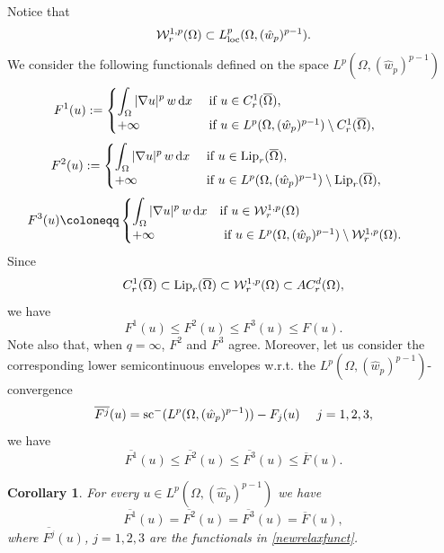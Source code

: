 \documentclass[11pt,leqno]{amsart}
\newtheorem{cor}[teo]{Corollary}
\theoremstyle{remark}
\theoremstyle{definition}
\theoremstyle{definition}
\newcommand{\wstar}{{\hat w}}
\newcommand{\ov}[1]{\overline{#1}}
\def\de{{\rm d}}
\begin{document}
Notice that
\begin{align*}
{\mathcal{W}}^{1,p}_r(\Omega)\subset L^p_{\rm{loc}}(\Omega,(\wstar_{p})^{p-1}).
\end{align*} 
We consider the following functionals defined on the space $L^p(\Omega,(\wstar_{p})^{p-1})$
\begin{equation*}
\!\!\!\!\!\! \!\!\! \!\!\!\!\!\! \!\!\!   F^1(u):=
\begin{cases}
\displaystyle\int_{\Omega} |\nabla u|^p\,w\,\de x &\text{ if } u\in C_{r}^1(\ov{\Omega}),\\
+\infty & \text{ if } u\in L^p(\Omega,(\wstar_{p})^{p-1})\setminus C_{r}^{1}(\ov{\Omega}) ,
\end{cases}
\end{equation*}
\begin{equation*}
\!\!\!\!\!\! \!\!\! \!\!\!\!\!\! \!  F^2(u):=
\begin{cases}
\displaystyle\int_{\Omega}|\nabla u|^p\,w\,\de x &\text{ if } u\in {\rm Lip}_r(\ov{\Omega}),\\
+\infty & \text{ if } u\in L^p(\Omega,(\wstar_{p})^{p-1})\setminus {\rm Lip}_{r}(\ov{\Omega}),
\end{cases}
\end{equation*}
\begin{equation*}
\!\!\!\!\!\! \!\!\! \!\!\!\!\!\! \!\!  F^3(u)\coloneqq
\begin{cases}
\displaystyle\int_{\Omega} |\nabla u|^p\,w\,\de x &\text{if $u\in {\mathcal{W}}_{r}^{1,p}(\Omega)$}\\
+\infty & \text{ if $u\in L^p(\Omega,(\wstar_{p})^{p-1})\setminus {\mathcal{W}}_{r}^{1,p}(\Omega)$}.
\end{cases}
\end{equation*}
Since
$$
C^1_r(\ov{\Omega})\subset {\rm Lip}_r(\ov{\Omega})\subset {\mathcal{W}}_{r}^{1,p}(\Omega)\subset AC_{r}^{d}(\Omega),
$$
we have
$$
F^1(u)\leq F^2(u)\leq F^3(u)\leq F(u).
$$
Note also that, when $q=\infty$, $F^{2}$ and $F^{3}$ agree. Moreover, let us consider the corresponding lower semicontinuous envelopes w.r.t. the $L^p(\Omega,(\wstar_{p})^{p-1})$-convergence 
\begin{equation}
\label{newrelaxfunct}
\overline {F^j}(u)={\rm sc^-}(L^p(\Omega,(\wstar_{p})^{p-1}))-F_j(u)\ \ \ \ j=1,2,3,
\end{equation}
we have
$$
\overline{F^1}(u)\leq \overline{F^2}(u)\leq \overline{F^3}(u)\leq \overline{F}(u).
$$
\begin{cor}\label{equivalenze}
For every $u\in L^p(\Omega,(\wstar_{p})^{p-1})$ we have
$$
\overline{F^1}(u)=\overline{F^2}(u)=\overline{F^3}(u)=\overline{F}(u),
$$
where
$\overline{F^j}(u)$, $j=1,2,3$ are the functionals in \eqref{newrelaxfunct}.
\end{cor}
\end{document}
